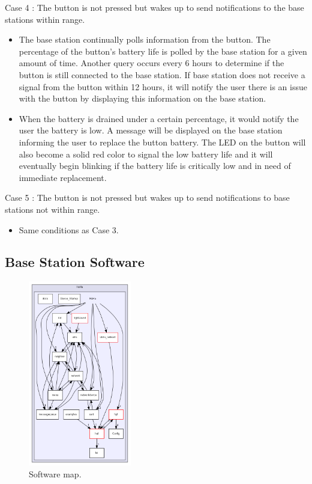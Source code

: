 \documentclass[journal,compsoc]{IEEEtran}
\begin{document}
\begin{LaTeXdescription}
\begin{itemize}
  \end{itemize}
\item[Case 4]:  The button is not pressed but wakes up to send notifications to the base stations within range.
  \begin{itemize}
    \item The base station continually polls information from the button.  The percentage of the button’s battery life is polled by the base station for a given amount of time.  Another query occurs every 6 hours to determine if the button is still connected to the base station.  If base station does not receive a signal from the button within 12 hours, it will notify the user there is an issue with the button by displaying this information on the base station.
    \item When the battery is drained under a certain percentage, it would notify the user the battery is low.  A message will be displayed on the base station informing the user to replace the button battery.  The LED on the button will also become a solid red color to signal the low battery life and it will eventually begin blinking if the battery life is critically low and in need of immediate replacement.
  \end{itemize}
\item[Case 5]: The button is not pressed but wakes up to send notifications to base stations not within range.
  \begin{itemize}
    \item Same conditions as Case 3.
  \end{itemize}
\end{LaTeXdescription}

\subsection{Base Station Software}

\begin{figure}[ht] 	%
\centering
\includegraphics[width=0.4\textwidth]{hahamap.png}
\caption{ \space Software map.}
\label{HaHa Application}
\end{figure}
\end{document}
